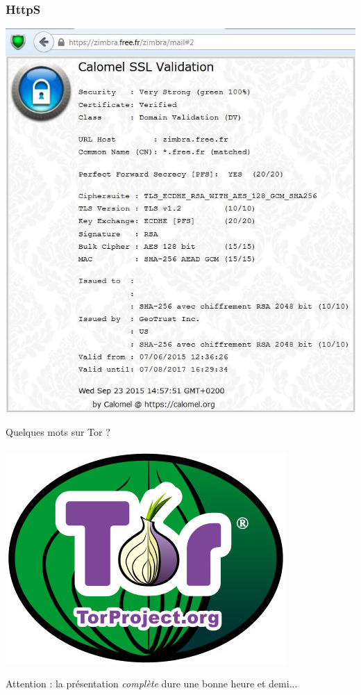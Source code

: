 \documentclass{beamer}
\begin{document}
\begin{frame}
\frametitle{HttpS}
\begin{center}
\includegraphics[scale=0.5] {./images/https.jpg}
\end{center}
\end{frame}

\begin{frame}
\begin{center}
\Huge{Quelques mots sur Tor ? }
\\~\\ \includegraphics[scale=0.4]{./images/logo_tor.jpg}
\end{center}
\huge{Attention : la présentation \emph{complète} dure une bonne heure et demi...}
\end{frame}
\end{document}
